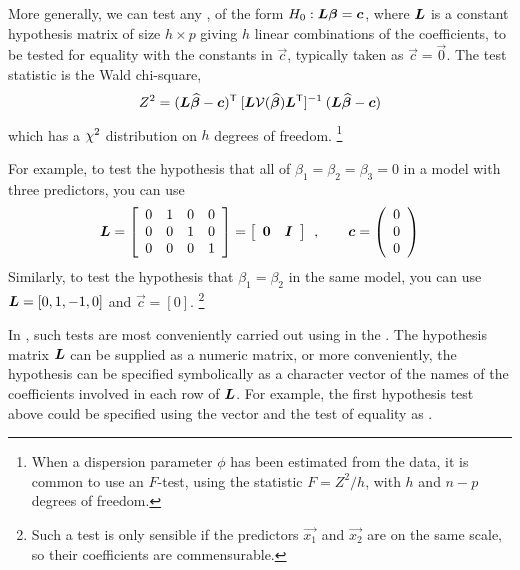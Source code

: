\documentclass[11pt]{book}\usepackage[]{graphicx}\usepackage[]{color}
\begin{document}
More generally, we can test any , of the form 
$H_0 : \bm{L} \bm{\beta} = \bm{c}$, where $\bm{L}$ is a constant hypothesis matrix
of size $h \times p$ giving $h$ linear combinations of the coefficients,
to be tested for equality with the constants in $\vec{c}$, typically taken as $\vec{c}=\vec{0}$.
The test statistic is the Wald chi-square,
\begin{equation}\label{eq:waldchisq}
Z^2 = (\bm{L} \widehat{\bm{\beta}} - \bm{c})^\mathsf{T} \:
      [\bm{L} \mathcal{V} (\widehat{\bm{\beta}}) \bm{L}^\mathsf{T}]^{-1} \:
      (\bm{L} \widehat{\bm{\beta}} - \bm{c})
\end{equation}
which has a $\chi^2$ distribution on $h$ degrees of freedom.%
\footnote{When a dispersion parameter $\phi$ has been estimated from the data,
it is common to use an $F$-test, using the statistic $F = Z^2 / h$,
with $h$ and $n-p$ degrees of freedom.}

For example, to test the hypothesis
that all of 
$\beta_1 = \beta_2 = \beta_3 =0$ in a model with three predictors, you can use
\begin{equation*}
\mat{L} = \left[ 
{\begin{array}{*{20}{c}}
0 & 1 & 0 & 0\\
0 & 0 & 1 & 0\\
0 & 0 & 0 &1
\end{array}} 
\right] =
\left[ 
{\begin{array}{*{20}{c}}
{\vec{0}} & {\mat{I}}
\end{array}} 
\right]
\comma
\quad\quad
\vec{c} = \left( 
{\begin{array}{*{20}{c}}
0\\
0\\
0
\end{array}} 
\right)
\end{equation*}
Similarly, to test the hypothesis that $\beta_1 = \beta_2$ in the same model,
you can use $\bm{L} = [0, 1, -1, 0]$ and $\vec{c} = [0]$.%
\footnote{Such a test is only sensible if the predictors $\vec{x_1}$ and $\vec{x_2}$
are on the same scale, so their coefficients are commensurable.}

In \R, such tests are most conveniently carried out using 
in the .  The hypothesis matrix $\bm{L}$ can be supplied as a
numeric matrix, or more conveniently,
the hypothesis can be specified symbolically as a character vector 
of the names of the coefficients involved in each row of $\bm{L}$.
For example, the first hypothesis test above could be specified using the vector
 and the test of equality as
.  
\end{document}
